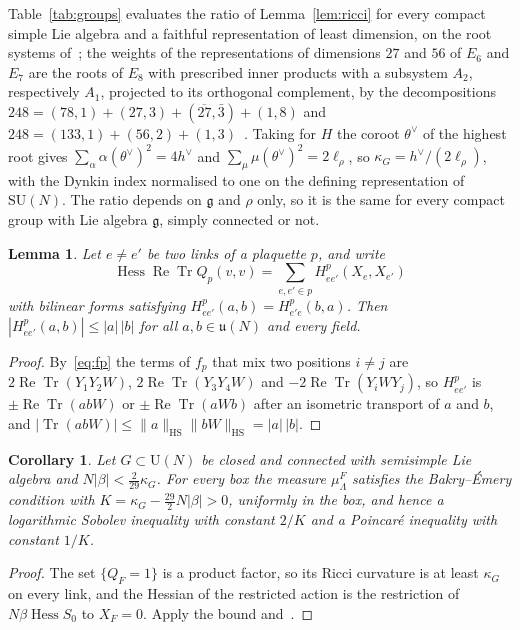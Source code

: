 \documentclass[aps,prd,twocolumn,superscriptaddress,nofootinbib,longbibliography,floatfix,amsmath,amssymb,10pt]{revtex4-2}
\newtheorem{lemma}[theorem]{Lemma}
\newtheorem{corollary}[theorem]{Corollary}
\theoremstyle{definition}
\theoremstyle{remark}
\newcommand{\SU}{\mathrm{SU}}
\newcommand{\U}{\mathrm{U}}
\newcommand{\g}{\mathfrak{g}}
\newcommand{\Tr}{\operatorname{Tr}}
\newcommand{\ReTr}{\operatorname{Re}\operatorname{Tr}}
\newcommand{\Hess}{\operatorname{Hess}}
\begin{document}
Table~\ref{tab:groups} evaluates the ratio of Lemma~\ref{lem:ricci} for
every compact simple Lie algebra and a faithful representation of least
dimension, on the root systems of~\cite[Sect.~12.1]{Hum72}; the weights of
the representations of dimensions $27$ and $56$ of $E_6$ and $E_7$ are the
roots of $E_8$ with prescribed inner products with a subsystem $A_2$,
respectively $A_1$, projected to its orthogonal complement, by the
decompositions $248=(78,1)+(27,3)+(\overline{27},\bar3)+(1,8)$ and
$248=(133,1)+(56,2)+(1,3)$~\cite{Sla81}. Taking for $H$ the coroot
$\theta^\vee$ of the highest root gives $\sum_\alpha\alpha(\theta^\vee)^2=4h^\vee$
and $\sum_\mu\mu(\theta^\vee)^2=2\ell_\rho$, so $\kappa_G=h^\vee/(2\ell_\rho)$, with
the Dynkin index normalised to one on the defining representation of
$\SU(N)$. The ratio depends on $\g$ and $\rho$ only, so it is the same for
every compact group with Lie algebra $\g$, simply connected or not.

\begin{lemma}\label{lem:mixed}
Let $e\ne e'$ be two links of a plaquette $p$, and write
\[
\Hess\ReTr Q_p(v,v)=\sum_{e,e'\in p}H^p_{ee'}(X_e,X_{e'})
\]
with bilinear forms satisfying $H^p_{ee'}(a,b)=H^p_{e'e}(b,a)$. Then $|H^p_{ee'}(a,b)|\le|a|\,|b|$ for all
$a,b\in\mathfrak u(N)$ and every field.
\end{lemma}

\begin{proof}
By~\eqref{eq:fp} the terms of $f_p$ that mix two positions $i\ne j$ are
$2\ReTr(Y_1Y_2W)$, $2\ReTr(Y_3Y_4W)$ and $-2\ReTr(Y_iWY_j)$, so $H^p_{ee'}$
is $\pm\ReTr(abW)$ or $\pm\ReTr(aWb)$ after an isometric transport of $a$
and $b$, and $|\Tr(abW)|\le\|a\|_{\mathrm{HS}}\|bW\|_{\mathrm{HS}}=|a|\,|b|$.
\end{proof}

\begin{corollary}\label{cor:be}
Let $G\subset\U(N)$ be closed and connected with semisimple Lie algebra and
$N|\beta|<\frac2{29}\kappa_G$. For every box the measure $\mu^F_\Lambda$
satisfies the Bakry--\'Emery condition with $K=\kappa_G-\frac{29}2N|\beta|>0$,
uniformly in the box, and hence a logarithmic Sobolev inequality with
constant $2/K$ and a Poincar\'e inequality with constant $1/K$.
\end{corollary}

\begin{proof}
The set $\{Q_F=1\}$ is a product factor, so its Ricci curvature is at least
$\kappa_G$ on every link, and the Hessian of the restricted action is the
restriction of $N\beta\Hess S_0$ to $X_F=0$. Apply the bound
and~\cite[Cor.~5.7.2]{BGL14}.
\end{proof}
\end{document}
